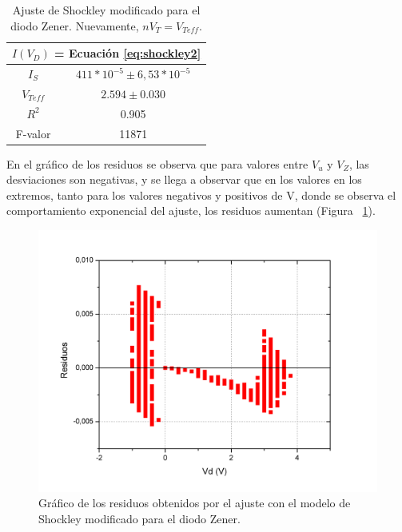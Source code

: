 \documentclass[twoside,twocolumn,a4paper]{article}
\begin{document}
\begin{table}[h!]
\centering
\captionsetup{justification=centering}
\caption{Ajuste de Shockley modificado para el diodo Zener. Nuevamente, $nV_{T} = V_{Teff}$.}
\label{tab:zener}
\begin{tabular}{|c|c|}
\hline
\multicolumn{2}{|c|}{$I(V_D)$ = Ecuaci\'on \ref{eq:shockley2}} \\ \hline
$I_S$                       & $411*10^{-5}\pm6,53*10^{-5}$                   \\ \hline
$V_{Teff}$                  & $2.594\pm0.030$                  \\ \hline
$R^2$                       & 0.905                              \\ \hline
F-valor                     & 11871                            \\ \hline
\end{tabular}
\end{table}

En el gr\'afico de los residuos se observa que para valores entre $V_{u}$ y $V_{Z}$, las desviaciones son negativas, y se llega a observar que en los valores en los extremos, tanto para los valores negativos y positivos de V, donde se observa el comportamiento exponencial del ajuste, los residuos aumentan (Figura ~\ref{fig:zener_residuos}).

\begin{figure}[H]
\includegraphics[width=\linewidth]{zener_residuos.jpg}
\captionsetup{justification=centering}
\caption{Gr\'afico de los residuos obtenidos por el ajuste con el modelo de Shockley modificado para el diodo Zener.}
\label{fig:zener_residuos}
\end{figure}
\end{document}
